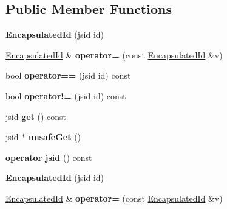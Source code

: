 \subsection*{Public Member Functions}
\begin{DoxyCompactItemize}
\item 
\hypertarget{classjs_1_1_encapsulated_id_a4b75b4bafec1ec39b3a5b66333c3e350}{{\bfseries Encapsulated\-Id} (jsid id)}\label{classjs_1_1_encapsulated_id_a4b75b4bafec1ec39b3a5b66333c3e350}

\item 
\hypertarget{classjs_1_1_encapsulated_id_ad92336430fa5b3bd1c6149616afd5e95}{\hyperlink{classjs_1_1_encapsulated_id}{Encapsulated\-Id} \& {\bfseries operator=} (const \hyperlink{classjs_1_1_encapsulated_id}{Encapsulated\-Id} \&v)}\label{classjs_1_1_encapsulated_id_ad92336430fa5b3bd1c6149616afd5e95}

\item 
\hypertarget{classjs_1_1_encapsulated_id_a1c227998ffb4fdb94dcbab19ffba5c3f}{bool {\bfseries operator==} (jsid id) const }\label{classjs_1_1_encapsulated_id_a1c227998ffb4fdb94dcbab19ffba5c3f}

\item 
\hypertarget{classjs_1_1_encapsulated_id_a27ffc392252fe9cce65b152714171bb0}{bool {\bfseries operator!=} (jsid id) const }\label{classjs_1_1_encapsulated_id_a27ffc392252fe9cce65b152714171bb0}

\item 
\hypertarget{classjs_1_1_encapsulated_id_ae9aa446e1cedd7c13e3ef3a5d83ee6e8}{jsid {\bfseries get} () const }\label{classjs_1_1_encapsulated_id_ae9aa446e1cedd7c13e3ef3a5d83ee6e8}

\item 
\hypertarget{classjs_1_1_encapsulated_id_a8da9b41e7361b1a05dd7cd478d68106e}{jsid $\ast$ {\bfseries unsafe\-Get} ()}\label{classjs_1_1_encapsulated_id_a8da9b41e7361b1a05dd7cd478d68106e}

\item 
\hypertarget{classjs_1_1_encapsulated_id_aeb0733c506051cf35deae1289af31e4d}{{\bfseries operator jsid} () const }\label{classjs_1_1_encapsulated_id_aeb0733c506051cf35deae1289af31e4d}

\item 
\hypertarget{classjs_1_1_encapsulated_id_a4b75b4bafec1ec39b3a5b66333c3e350}{{\bfseries Encapsulated\-Id} (jsid id)}\label{classjs_1_1_encapsulated_id_a4b75b4bafec1ec39b3a5b66333c3e350}

\item 
\hypertarget{classjs_1_1_encapsulated_id_ad92336430fa5b3bd1c6149616afd5e95}{\hyperlink{classjs_1_1_encapsulated_id}{Encapsulated\-Id} \& {\bfseries operator=} (const \hyperlink{classjs_1_1_encapsulated_id}{Encapsulated\-Id} \&v)}\label{classjs_1_1_encapsulated_id_ad92336430fa5b3bd1c6149616afd5e95}


\end{DoxyCompactItemize}
